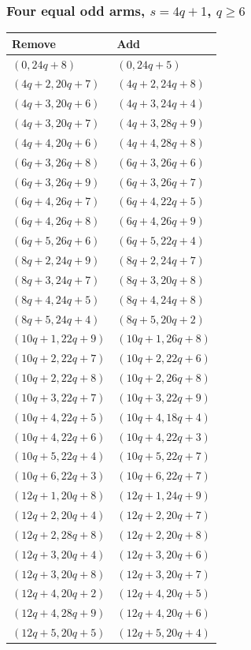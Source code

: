 \subsubsection[Four equal odd arms, s=4q+1, q >= 6]{Four equal odd arms, $s=4q+1$, $q\ge6$}
\label{templates:four-r1}
\begingroup\small
\begin{longtable}{ll}
Remove & Add\\\hline\endhead
$(0,24q+8)$ & $(0,24q+5)$\\
$(4q+2,20q+7)$ & $(4q+2,24q+8)$\\
$(4q+3,20q+6)$ & $(4q+3,24q+4)$\\
$(4q+3,20q+7)$ & $(4q+3,28q+9)$\\
$(4q+4,20q+6)$ & $(4q+4,28q+8)$\\
$(6q+3,26q+8)$ & $(6q+3,26q+6)$\\
$(6q+3,26q+9)$ & $(6q+3,26q+7)$\\
$(6q+4,26q+7)$ & $(6q+4,22q+5)$\\
$(6q+4,26q+8)$ & $(6q+4,26q+9)$\\
$(6q+5,26q+6)$ & $(6q+5,22q+4)$\\
$(8q+2,24q+9)$ & $(8q+2,24q+7)$\\
$(8q+3,24q+7)$ & $(8q+3,20q+8)$\\
$(8q+4,24q+5)$ & $(8q+4,24q+8)$\\
$(8q+5,24q+4)$ & $(8q+5,20q+2)$\\
$(10q+1,22q+9)$ & $(10q+1,26q+8)$\\
$(10q+2,22q+7)$ & $(10q+2,22q+6)$\\
$(10q+2,22q+8)$ & $(10q+2,26q+8)$\\
$(10q+3,22q+7)$ & $(10q+3,22q+9)$\\
$(10q+4,22q+5)$ & $(10q+4,18q+4)$\\
$(10q+4,22q+6)$ & $(10q+4,22q+3)$\\
$(10q+5,22q+4)$ & $(10q+5,22q+7)$\\
$(10q+6,22q+3)$ & $(10q+6,22q+7)$\\
$(12q+1,20q+8)$ & $(12q+1,24q+9)$\\
$(12q+2,20q+4)$ & $(12q+2,20q+7)$\\
$(12q+2,28q+8)$ & $(12q+2,20q+8)$\\
$(12q+3,20q+4)$ & $(12q+3,20q+6)$\\
$(12q+3,20q+8)$ & $(12q+3,20q+7)$\\
$(12q+4,20q+2)$ & $(12q+4,20q+5)$\\
$(12q+4,28q+9)$ & $(12q+4,20q+6)$\\
$(12q+5,20q+5)$ & $(12q+5,20q+4)$\\

\end{longtable}
